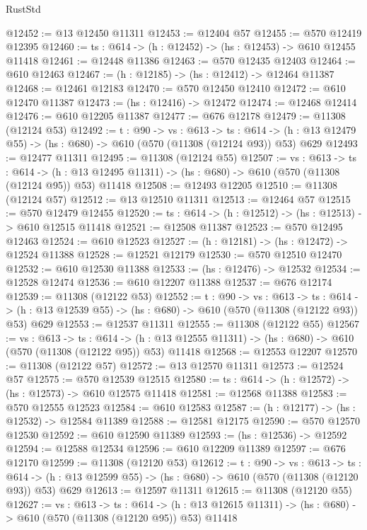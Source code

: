 \begin{lexlean}{RustStd}
\begin{coremodule}
@12452 := @13 @12450 @11311
@12453 := @12404 @57
@12455 := @570 @12419 @12395
@12460 := {ts : @614} -> (h : @12452) -> (hs : @12453) -> @610 @12455 @11418
@12461 := @12448 @11386
@12463 := @570 @12435 @12403
@12464 := @610 @12463
@12467 := (h : @12185) -> (hs : @12412) -> @12464 @11387
@12468 := @12461 @12183
@12470 := @570 @12450 @12410
@12472 := @610 @12470 @11387
@12473 := (hs : @12416) -> @12472
@12474 := @12468 @12414
@12476 := @610 @12205 @11387
@12477 := @676 @12178
@12479 := @11308 (@12124 @53)
@12492 := {t : @90} ->
  {vs : @613} ->
  {ts : @614} -> (h : @13 @12479 @55) -> (hs : @680) -> @610 (@570 (@11308 (@12124 @93)) @53) @629
@12493 := @12477 @11311
@12495 := @11308 (@12124 @55)
@12507 := {vs : @613} ->
  {ts : @614} ->
  (h : @13 @12495 @11311) -> (hs : @680) -> @610 (@570 (@11308 (@12124 @95)) @53) @11418
@12508 := @12493 @12205
@12510 := @11308 (@12124 @57)
@12512 := @13 @12510 @11311
@12513 := @12464 @57
@12515 := @570 @12479 @12455
@12520 := {ts : @614} -> (h : @12512) -> (hs : @12513) -> @610 @12515 @11418
@12521 := @12508 @11387
@12523 := @570 @12495 @12463
@12524 := @610 @12523
@12527 := (h : @12181) -> (hs : @12472) -> @12524 @11388
@12528 := @12521 @12179
@12530 := @570 @12510 @12470
@12532 := @610 @12530 @11388
@12533 := (hs : @12476) -> @12532
@12534 := @12528 @12474
@12536 := @610 @12207 @11388
@12537 := @676 @12174
@12539 := @11308 (@12122 @53)
@12552 := {t : @90} ->
  {vs : @613} ->
  {ts : @614} -> (h : @13 @12539 @55) -> (hs : @680) -> @610 (@570 (@11308 (@12122 @93)) @53) @629
@12553 := @12537 @11311
@12555 := @11308 (@12122 @55)
@12567 := {vs : @613} ->
  {ts : @614} ->
  (h : @13 @12555 @11311) -> (hs : @680) -> @610 (@570 (@11308 (@12122 @95)) @53) @11418
@12568 := @12553 @12207
@12570 := @11308 (@12122 @57)
@12572 := @13 @12570 @11311
@12573 := @12524 @57
@12575 := @570 @12539 @12515
@12580 := {ts : @614} -> (h : @12572) -> (hs : @12573) -> @610 @12575 @11418
@12581 := @12568 @11388
@12583 := @570 @12555 @12523
@12584 := @610 @12583
@12587 := (h : @12177) -> (hs : @12532) -> @12584 @11389
@12588 := @12581 @12175
@12590 := @570 @12570 @12530
@12592 := @610 @12590 @11389
@12593 := (hs : @12536) -> @12592
@12594 := @12588 @12534
@12596 := @610 @12209 @11389
@12597 := @676 @12170
@12599 := @11308 (@12120 @53)
@12612 := {t : @90} ->
  {vs : @613} ->
  {ts : @614} -> (h : @13 @12599 @55) -> (hs : @680) -> @610 (@570 (@11308 (@12120 @93)) @53) @629
@12613 := @12597 @11311
@12615 := @11308 (@12120 @55)
@12627 := {vs : @613} ->
  {ts : @614} ->
  (h : @13 @12615 @11311) -> (hs : @680) -> @610 (@570 (@11308 (@12120 @95)) @53) @11418

\end{coremodule}
\end{lexlean}
